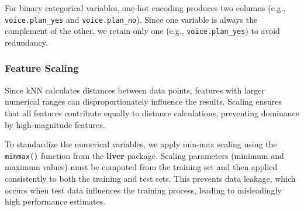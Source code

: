 \documentclass[
  11pt,
]{book}
\makeatletter
\newenvironment{Shaded}{}{}
\newcommand{\DecValTok}[1]{#1}
\newcommand{\FloatTok}[1]{#1}
\newcommand{\NormalTok}[1]{#1}
\newcommand{\SpecialCharTok}[1]{\textcolor[rgb]{0.39,0.39,0.39}{#1}}
\newcommand{\StringTok}[1]{\textcolor[rgb]{0.39,0.39,0.39}{#1}}
\newenvironment{kframe}{%
\medskip{}
\setlength{\fboxsep}{.8em}
 \def\at@end@of@kframe{}%
 \ifinner\ifhmode%
  \def\at@end@of@kframe{\end{minipage}}%
  \begin{minipage}{\columnwidth}%
 \fi\fi%
 \def\FrameCommand##1{\hskip\@totalleftmargin \hskip-\fboxsep
 \colorbox{shadecolor}{##1}\hskip-\fboxsep
     \hskip-\linewidth \hskip-\@totalleftmargin \hskip\columnwidth}%
 \MakeFramed {\advance\hsize-\width
   \@totalleftmargin\z@ \linewidth\hsize
   \@setminipage}}%
 {\par\unskip\endMakeFramed%
 \at@end@of@kframe}
\renewenvironment{Shaded}{\begin{kframe}}{\end{kframe}}
\theoremstyle{definition}
\theoremstyle{definition}
\theoremstyle{definition}
\theoremstyle{definition}
\theoremstyle{remark}
\makeatother
\begin{document}
\begin{Shaded}
\end{Shaded}

For binary categorical variables, one-hot encoding produces two columns (e.g., \texttt{voice.plan\_yes} and \texttt{voice.plan\_no}). Since one variable is always the complement of the other, we retain only one (e.g., \texttt{voice.plan\_yes}) to avoid redundancy.

\subsubsection*{Feature Scaling}\label{feature-scaling-2}


Since kNN calculates distances between data points, features with larger numerical ranges can disproportionately influence the results. Scaling ensures that all features contribute equally to distance calculations, preventing dominance by high-magnitude features.

To standardize the numerical variables, we apply min-max scaling using the \texttt{minmax()} function from the \textbf{liver} package. Scaling parameters (minimum and maximum values) must be computed from the training set and then applied consistently to both the training and test sets. This prevents data leakage, which occurs when test data influences the training process, leading to misleadingly high performance estimates.
\end{document}
